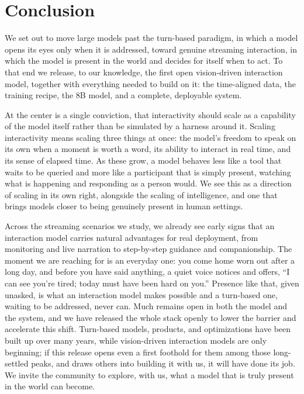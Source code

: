 
\section{Conclusion}\label{sec:conclusion}
We set out to move large models past the turn-based paradigm, in which a model opens its eyes only when it is addressed, toward genuine streaming interaction, in which the model is present in the world and decides for itself when to act. To that end we release, to our knowledge, the first open vision-driven interaction model, together with everything needed to build on it: the time-aligned data, the training recipe, the 8B model, and a complete, deployable system.

At the center is a single conviction, that interactivity should scale as a capability of the model itself rather than be simulated by a harness around it. Scaling interactivity means scaling three things at once: the model's freedom to speak on its own when a moment is worth a word, its ability to interact in real time, and its sense of elapsed time. As these grow, a model behaves less like a tool that waits to be queried and more like a participant that is simply present, watching what is happening and responding as a person would. We see this as a direction of scaling in its own right, alongside the scaling of intelligence, and one that brings models closer to being genuinely present in human settings.

Across the streaming scenarios we study, we already see early signs that an interaction model carries natural advantages for real deployment, from monitoring and live narration to step-by-step guidance and companionship. The moment we are reaching for is an everyday one: you come home worn out after a long day, and before you have said anything, a quiet voice notices and offers, ``I can see you're tired; today must have been hard on you.'' Presence like that, given unasked, is what an interaction model makes possible and a turn-based one, waiting to be addressed, never can. Much remains open in both the model and the system, and we have released the whole stack openly to lower the barrier and accelerate this shift. Turn-based models, products, and optimizations have been built up over many years, while vision-driven interaction models are only beginning; if this release opens even a first foothold for them among those long-settled peaks, and draws others into building it with us, it will have done its job. We invite the community to explore, with us, what a model that is truly present in the world can become. 